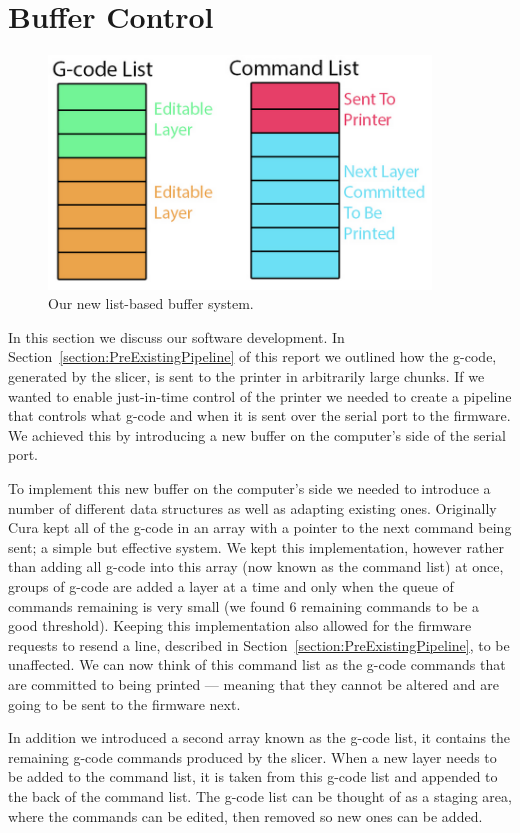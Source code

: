 \documentclass[11pt]{report} %
\begin{document}
\section{Buffer Control}
\label{section:BufferControl}
\begin{figure}[H]
  \centering
  \includegraphics[width=4in]{james_two_lists.png}
  \caption{Our new list-based buffer system.}
  \label{figure:Jlists}
\end{figure}
In this section we discuss our software development. In Section~\ref{section:PreExistingPipeline} of this report we outlined how the g-code, generated by the slicer, is sent to the printer in arbitrarily large chunks. If we wanted to enable just-in-time control of the printer we needed to create a pipeline that controls what g-code and when it is sent over the serial port to the firmware. We achieved this by introducing a new buffer on the computer's side of the serial port.

To implement this new buffer on the computer's side we needed to introduce a number of different data structures as well as adapting existing ones. Originally Cura kept all of the g-code in an array with a pointer to the next command being sent; a simple but effective system. We kept this implementation, however rather than adding all g-code into this array (now known as the command list) at once, groups of g-code are added a layer at a time and only when the queue of commands remaining is very small (we found 6 remaining commands to be a good threshold). Keeping this implementation also allowed for the firmware requests to resend a line, described in Section~\ref{section:PreExistingPipeline}, to be unaffected. We can now think of this command list as the g-code commands that are committed to being printed --- meaning that they cannot be altered and are going to be sent to the firmware next.

In addition we introduced a second array known as the g-code list, it contains the remaining g-code commands produced by the slicer. When a new layer needs to be added to the command list, it is taken from this g-code list and appended to the back of the command list. The g-code list can be thought of as a staging area, where the commands can be edited, then removed so new ones can be added.
\end{document}
